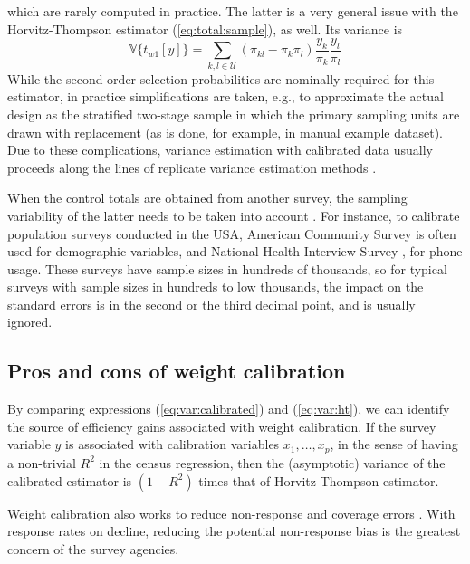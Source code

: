 which are rarely computed in practice. The latter is a very general issue
with the Horvitz-Thompson estimator (\ref{eq:total:sample}), as well.
Its variance is
\begin{equation}
    \mathbb{V}\bigl\{t_{w1}[y]\bigr\} = \sum_{k,l \in \mathcal{U}}
        (\pi_{kl}-\pi_k \pi_l)
        \frac{y_k}{\pi_k}
        \frac{y_l}{\pi_l}
    \label{eq:var:ht}
\end{equation}
While the second order selection probabilities are nominally required
for this estimator, in practice simplifications are taken, e.g.,
to approximate the actual design as the stratified two-stage sample
in which the primary sampling units are drawn with replacement
(as is done, for example, in  \svyref{} manual example
dataset). Due to these complications, variance estimation with
calibrated data usually proceeds along the lines of
replicate variance estimation methods \citep{shao:1996,kolenikov:2010}.

When the control totals are obtained from another survey,
the sampling variability of the latter needs to be taken
into account \citep{dever:valliant:2010}. For instance,
to calibrate population surveys conducted in the USA,
American Community Survey \citep{acs:2009}
is often used for demographic variables,
and National Health Interview Survey \citep{nhis:2000}, for phone usage.
These surveys have sample sizes in hundreds of thousands,
so for typical surveys with sample sizes in hundreds to low thousands,
the impact on the standard errors is in the second or the third
decimal point, and is usually ignored.


\subsection{Pros and cons of weight calibration}

By comparing expressions (\ref{eq:var:calibrated}) and
(\ref{eq:var:ht}), we can identify the source of efficiency gains
associated with weight calibration. If the survey variable
$y$ is associated with calibration variables $x_1,\ldots,x_p$,
in the sense of having a non-trivial $R^2$ in the census regression,
then the (asymptotic) variance of the calibrated estimator is
$(1-R^2)$ times that of Horvitz-Thompson estimator.

Weight calibration also works to reduce non-response
and coverage errors \citep{kott:2006}.
With response rates on decline, reducing the potential
non-response bias is the greatest concern of the survey agencies.


